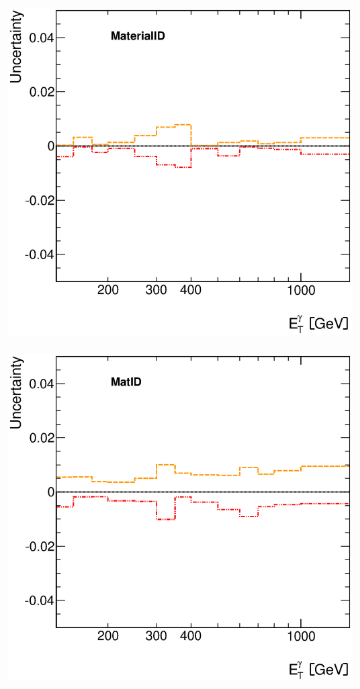 \documentclass[12pt, twoside]{article}
\numberwithin{equation}{section}
\numberwithin{figure}{section}
\newenvironment{changemargin}[2]{%
\begin{list}{}{%
\setlength{\topsep}{0pt}%
\setlength{\leftmargin}{#1}%
\setlength{\rightmargin}{#2}%
\setlength{\listparindent}{\parindent}%
\setlength{\itemindent}{\parindent}%
\setlength{\parsep}{\parskip}%
}%
\item[]}{\end{list}}
\begin{document}
\begin{figure}
\begin{changemargin}{-1.0cm}{-0.75cm}
\begin{changemargin}{-0.75cm}{-1.0cm}
\begin{subfigure}[b]{0.27\textwidth}
        \end{subfigure}
        \begin{subfigure}[b]{0.27\textwidth}
            \includegraphics[width=\textwidth]{./images/PhotonSystematics/PhotonSystematic-18.eps}
        \end{subfigure}
        \begin{subfigure}[b]{0.27\textwidth}
            \includegraphics[width=\textwidth]{./images/PhotonSystematics/PhotonSystematic-19.eps}
        \end{subfigure}


\end{changemargin}
\end{changemargin}
\end{figure}
\end{document}
